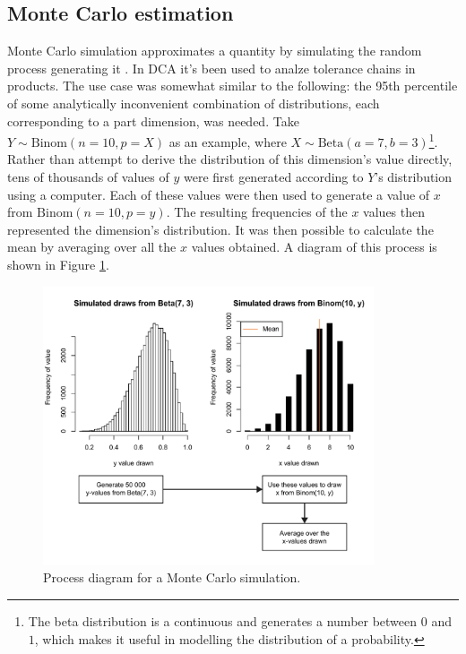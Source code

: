 \documentclass[11pt,a4paper,article]{memoir} %
\begin{document}
\subsection*{Monte Carlo estimation}
Monte Carlo simulation approximates a quantity by simulating the random process generating it . In DCA it's been used to analze tolerance chains in products. The use case was somewhat similar to the following: the 95th percentile of some analytically inconvenient combination of distributions, each corresponding to a part dimension, was needed. Take $Y \sim \text{Binom}(n = 10, p = X)$ as an example, where $X \sim \text{Beta}(a = 7, b = 3)$\footnote{The beta distribution is a continuous and generates a number between $0$ and $1$, which makes it useful in modelling the distribution of a probability.}. Rather than attempt to derive the distribution of this dimension's value directly, tens of thousands of values of $y$ were first generated according to $Y$'s distribution using a computer. Each of these values were then used to generate a value of $x$ from $\text{Binom}(n = 10, p = y)$. The resulting frequencies of the $x$ values then represented the dimension's distribution. It was then possible to calculate the mean by averaging over all the $x$ values obtained. A diagram of this process is shown in Figure \ref{fig:monte_carlo}.
\begin{figure}[b!]
\includegraphics[width=0.87\textwidth]{monte_carlo_simulation.pdf}
\caption{Process diagram for a Monte Carlo simulation.}
\label{fig:monte_carlo}
\end{figure}


\newpage
\end{document}

